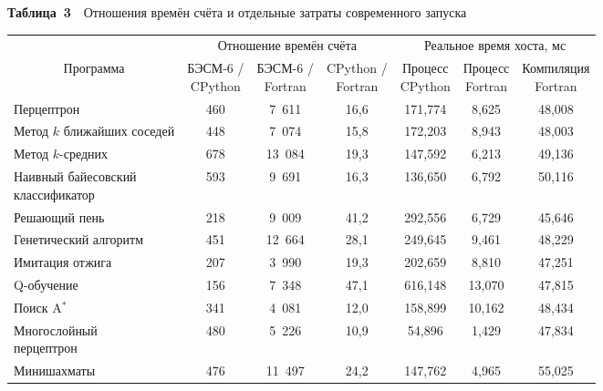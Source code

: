 \documentclass[a4paper,12pt]{article}
\begin{document}
\begin{table}[!ht]\small\tabcolsep=4pt
\noindent\textbf{Таблица~3}\ \ Отношения времён счёта и отдельные затраты современного запуска\par\vspace{4pt}
\centering
\begin{tabular}{|l|c|c|c|c|c|c|}
\hline
 & \multicolumn{3}{c|}{Отношение времён счёта} & \multicolumn{3}{c|}{Реальное время хоста, мс} \\
\cline{2-7}
\multicolumn{1}{|c|}{Программа} & \hd{БЭСМ-6 /\\CPython} & \hd{БЭСМ-6 /\\Fortran} & \hd{CPython /\\Fortran} & \hd{Процесс\\CPython} & \hd{Процесс\\Fortran} & \hd{Компиляция\\Fortran} \\
\hline
Перцептрон & 460 & 7~611 & 16,6 & 171,774 & 8,625 & 48,008 \\ \hline
\hl{Метод $k$ ближайших\\соседей} & 448 & 7~074 & 15,8 & 172,203 & 8,943 & 48,003 \\ \hline
Метод $k$-средних & 678 & 13~084 & 19,3 & 147,592 & 6,213 & 49,136 \\ \hline
\hl{Наивный байесовский\\классификатор} & 593 & 9~691 & 16,3 & 136,650 & 6,792 & 50,116 \\ \hline
Решающий пень & 218 & 9~009 & 41,2 & 292,556 & 6,729 & 45,646 \\ \hline
Генетический алгоритм & 451 & 12~664 & 28,1 & 249,645 & 9,461 & 48,229 \\ \hline
Имитация отжига & 207 & 3~990 & 19,3 & 202,659 & 8,810 & 47,251 \\ \hline
Q-обучение & 156 & 7~348 & 47,1 & 616,148 & 13,070 & 47,815 \\ \hline
Поиск A$^*$ & 341 & 4~081 & 12,0 & 158,899 & 10,162 & 48,434 \\ \hline
\hl{Многослойный\\перцептрон} & 480 & 5~226 & 10,9 & 54,896 & 1,429 & 47,834 \\ \hline
Минишахматы & 476 & 11~497 & 24,2 & 147,762 & 4,965 & 55,025 \\ \hline
\end{tabular}
\par\smallskip{}
\end{table}
\end{document}
